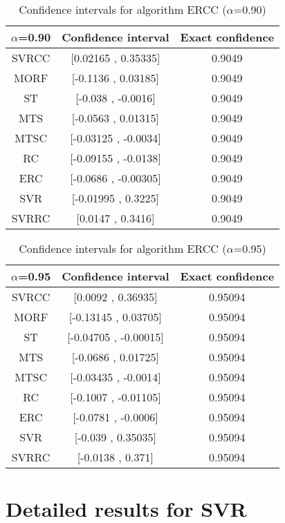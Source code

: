 \documentclass[a4paper,10pt]{article}
\begin{document}
\begin{table}[!htp]
\centering\small
\begin{tabular}{
|c|c|c|}
\hline
 $\alpha$=0.90 & Confidence interval & Exact confidence \\ \hline 
SVRCC & [0.02165 , 0.35335] & 0.9049\\ \hline 
MORF & [-0.1136 , 0.03185] & 0.9049\\ \hline 
ST & [-0.038 , -0.0016] & 0.9049\\ \hline 
MTS & [-0.0563 , 0.01315] & 0.9049\\ \hline 
MTSC & [-0.03125 , -0.0034] & 0.9049\\ \hline 
RC & [-0.09155 , -0.0138] & 0.9049\\ \hline 
ERC & [-0.0686 , -0.00305] & 0.9049\\ \hline 
SVR & [-0.01995 , 0.3225] & 0.9049\\ \hline 
SVRRC & [0.0147 , 0.3416] & 0.9049\\ \hline 

\end{tabular}
\caption{Confidence intervals for algorithm ERCC ($\alpha$=0.90)}
\end{table}
\begin{table}[!htp]
\centering\small
\begin{tabular}{
|c|c|c|}
\hline
 $\alpha$=0.95 & Confidence interval & Exact confidence \\ \hline 
SVRCC & [0.0092 , 0.36935] & 0.95094\\ \hline 
MORF & [-0.13145 , 0.03705] & 0.95094\\ \hline 
ST & [-0.04705 , -0.00015] & 0.95094\\ \hline 
MTS & [-0.0686 , 0.01725] & 0.95094\\ \hline 
MTSC & [-0.03435 , -0.0014] & 0.95094\\ \hline 
RC & [-0.1007 , -0.01105] & 0.95094\\ \hline 
ERC & [-0.0781 , -0.0006] & 0.95094\\ \hline 
SVR & [-0.039 , 0.35035] & 0.95094\\ \hline 
SVRRC & [-0.0138 , 0.371] & 0.95094\\ \hline 

\end{tabular}
\caption{Confidence intervals for algorithm ERCC ($\alpha$=0.95)}
\end{table}

 \clearpage 


\section{Detailed results for SVR}
\end{document}
